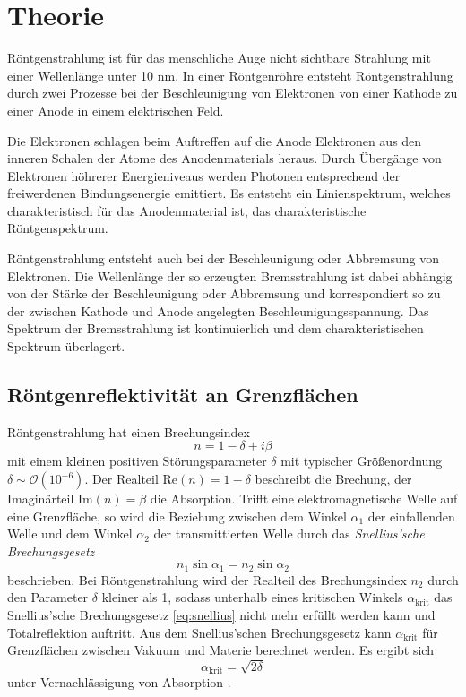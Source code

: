 \section{Theorie}
Röntgenstrahlung ist für das menschliche Auge nicht sichtbare Strahlung mit einer Wellenlänge unter 10 nm.
In einer Röntgenröhre entsteht Röntgenstrahlung durch zwei Prozesse bei der Beschleunigung von 
Elektronen von einer Kathode zu einer Anode in einem elektrischen Feld. 

Die Elektronen schlagen
beim Auftreffen auf die Anode Elektronen aus den inneren Schalen der Atome des Anodenmaterials heraus. 
Durch Übergänge von Elektronen höhrerer Energieniveaus werden Photonen entsprechend der 
freiwerdenen Bindungsenergie emittiert. Es entsteht ein Linienspektrum, welches charakteristisch für das 
Anodenmaterial ist, das charakteristische Röntgenspektrum. 

Röntgenstrahlung entsteht auch bei der Beschleunigung oder Abbremsung von Elektronen. Die 
Wellenlänge der so erzeugten Bremsstrahlung ist dabei abhängig von der Stärke der Beschleunigung oder 
Abbremsung und korrespondiert so zu der zwischen Kathode und Anode angelegten Beschleunigungsspannung.
Das Spektrum der Bremsstrahlung ist kontinuierlich und dem charakteristischen Spektrum überlagert.

\subsection*{Röntgenreflektivität an Grenzflächen}
Röntgenstrahlung hat einen Brechungsindex
\begin{equation*}
    n = 1 - \delta + i \beta
\end{equation*}
mit einem kleinen positiven Störungsparameter $\delta$ mit typischer Größenordnung 
$\delta \sim \mathcal{O}(10^{-6})$. Der Realteil $\text{Re}(n) = 1-\delta$ beschreibt die Brechung, der
Imaginärteil $\text{Im}(n) = \beta$ die Absorption.
Trifft eine elektromagnetische Welle auf eine Grenzfläche, so wird die Beziehung zwischen dem Winkel 
$\alpha_1$ der einfallenden Welle und dem Winkel $\alpha_2$ der transmittierten Welle durch das 
\textit{Snellius'sche Brechungsgesetz}
\begin{equation}
    n_1 \sin \alpha_1 = n_2 \sin \alpha_2 
    \label{eq:snellius}
\end{equation}
beschrieben. Bei Röntgenstrahlung wird der Realteil des Brechungsindex $n_2$ durch den Parameter $\delta$ 
kleiner als 1, sodass unterhalb eines kritischen Winkels $\alpha_\text{krit}$ das Snellius'sche Brechungsgesetz
\ref{eq:snellius} nicht mehr erfüllt werden kann und Totalreflektion auftritt.
Aus dem Snellius'schen Brechungsgesetz kann $\alpha_\text{krit}$ für Grenzflächen zwischen Vakuum und 
Materie berechnet werden. Es ergibt sich 
\begin{equation*}
    \alpha_\text{krit} = \sqrt{2 \delta}
\end{equation*}
unter Vernachlässigung von Absorption \cite{dissertation2}.

